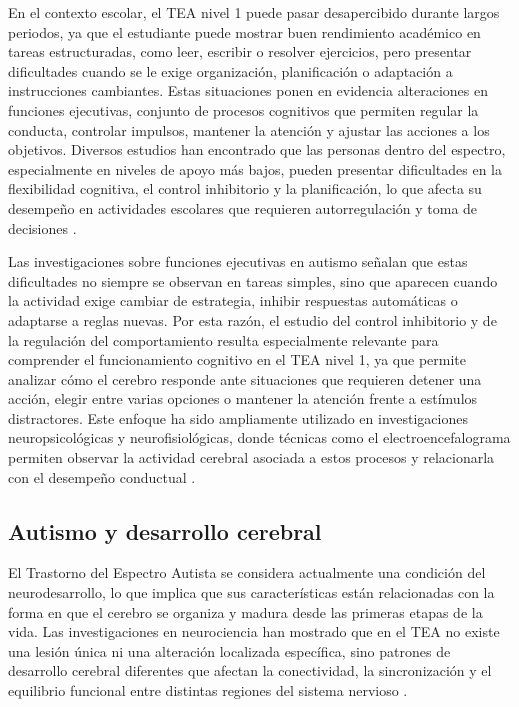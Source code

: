 \documentclass{book}
\begin{document}
En el contexto escolar, el TEA nivel 1 puede pasar desapercibido durante largos periodos, ya que el estudiante puede mostrar buen rendimiento académico en tareas estructuradas, como leer, escribir o resolver ejercicios, pero presentar dificultades cuando se le exige organización, planificación o adaptación a instrucciones cambiantes. Estas situaciones ponen en evidencia alteraciones en funciones ejecutivas, conjunto de procesos cognitivos que permiten regular la conducta, controlar impulsos, mantener la atención y ajustar las acciones a los objetivos. Diversos estudios han encontrado que las personas dentro del espectro, especialmente en niveles de apoyo más bajos, pueden presentar dificultades en la flexibilidad cognitiva, el control inhibitorio y la planificación, lo que afecta su desempeño en actividades escolares que requieren autorregulación y toma de decisiones \cite{Hill2004, Geurts2009, Diamond2013}.

Las investigaciones sobre funciones ejecutivas en autismo señalan que estas dificultades no siempre se observan en tareas simples, sino que aparecen cuando la actividad exige cambiar de estrategia, inhibir respuestas automáticas o adaptarse a reglas nuevas. Por esta razón, el estudio del control inhibitorio y de la regulación del comportamiento resulta especialmente relevante para comprender el funcionamiento cognitivo en el TEA nivel 1, ya que permite analizar cómo el cerebro responde ante situaciones que requieren detener una acción, elegir entre varias opciones o mantener la atención frente a estímulos distractores. Este enfoque ha sido ampliamente utilizado en investigaciones neuropsicológicas y neurofisiológicas, donde técnicas como el electroencefalograma permiten observar la actividad cerebral asociada a estos procesos y relacionarla con el desempeño conductual \cite{Diamond2013, Hill2004, Lord2018}.

\subsection{Autismo y desarrollo cerebral}

El Trastorno del Espectro Autista se considera actualmente una condición del neurodesarrollo, lo que implica que sus características están relacionadas con la forma en que el cerebro se organiza y madura desde las primeras etapas de la vida. Las investigaciones en neurociencia han mostrado que en el TEA no existe una lesión única ni una alteración localizada específica, sino patrones de desarrollo cerebral diferentes que afectan la conectividad, la sincronización y el equilibrio funcional entre distintas regiones del sistema nervioso \cite{Courchesne2007, Ecker2015, Lord2018}.
\end{document}
